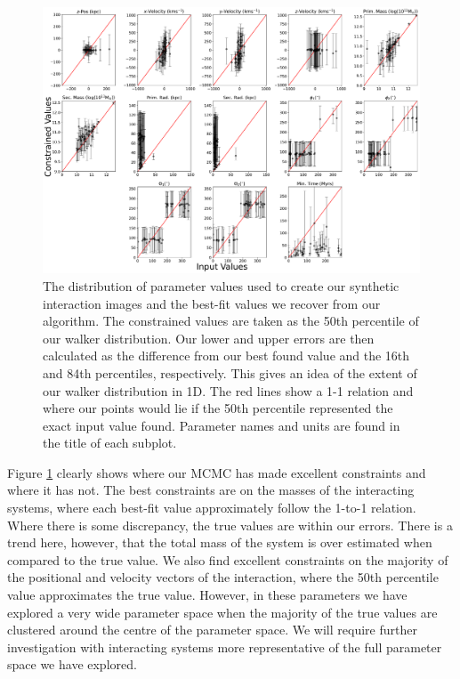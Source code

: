 \begin{figure}
\centering
\includegraphics[width=\textwidth]{Chapter1/figures/51_51.pdf}
\caption[The distribution of parameter values used to create our synthetic interaction images and the best-fit values we recover from our algorithm.]{The distribution of parameter values used to create our synthetic interaction images and the best-fit values we recover from our algorithm. The constrained values are taken as the 50th percentile of our walker distribution. Our lower and upper errors are then calculated as the difference from our best found value and the 16th and 84th percentiles, respectively. This gives an idea of the extent of our walker distribution in 1D. The red lines show a 1-1 relation and where our points would lie if the 50th percentile represented the exact input value found. Parameter names and units are found in the title of each subplot.}
\label{fig:true-found-parameters}
\end{figure}

Figure \ref{fig:true-found-parameters} clearly shows where our MCMC has made excellent constraints and where it has not. The best constraints are on the masses of the interacting systems, where each best-fit value approximately follow the 1-to-1 relation. Where there is some discrepancy, the true values are within our errors. There is a trend here, however, that the total mass of the system is over estimated when compared to the true value. We also find excellent constraints on the majority of the positional and velocity vectors of the interaction, where the 50th percentile value approximates the true value. However, in these parameters we have explored a very wide parameter space when the majority of the true values are clustered around the centre of the parameter space. We will require further investigation with interacting systems more representative of the full parameter space we have explored. 

